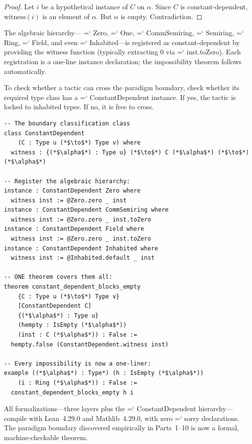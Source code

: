 \documentclass[11pt]{article}
\renewcommand{\texttt}[1]{%
  \begingroup\ttfamily\hyphenchar\font=`\-\relax
  \def\_{\textunderscore\discretionary{}{}{}}%
  #1\endgroup}
\theoremstyle{definition}
\theoremstyle{remark}
\begin{document}
\begin{proof}
Let $i$ be a hypothetical instance of $C$ on $\alpha$.
Since $C$ is constant-dependent, $\mathrm{witness}(i)$ is an
element of $\alpha$.  But $\alpha$ is empty.  Contradiction.
\end{proof}

\noindent The algebraic hierarchy---\texttt{Zero}, \texttt{One},
\texttt{CommSemiring}, \texttt{Semiring}, \texttt{Ring},
\texttt{Field}, and even \texttt{Inhabited}---is registered as
constant-dependent by providing the witness function (typically
extracting $0$ via \texttt{inst.toZero}).  Each registration is a
one-line instance declaration; the impossibility theorem follows
automatically.

To check whether a tactic can cross the paradigm boundary, check
whether its required type class has a \texttt{ConstantDependent}
instance.  If yes, the tactic is locked to inhabited types.  If
no, it is free to cross.

\begin{lstlisting}
-- The boundary classification class
class ConstantDependent
    (C : Type u (*$\to$*) Type v) where
  witness : {(*$\alpha$*) : Type u} (*$\to$*) C (*$\alpha$*) (*$\to$*) (*$\alpha$*)

-- Register the algebraic hierarchy:
instance : ConstantDependent Zero where
  witness inst := @Zero.zero _ inst
instance : ConstantDependent CommSemiring where
  witness inst := @Zero.zero _ inst.toZero
instance : ConstantDependent Field where
  witness inst := @Zero.zero _ inst.toZero
instance : ConstantDependent Inhabited where
  witness inst := @Inhabited.default _ inst

-- ONE theorem covers them all:
theorem constant_dependent_blocks_empty
    {C : Type u (*$\to$*) Type v}
    [ConstantDependent C]
    {(*$\alpha$*) : Type u}
    (hempty : IsEmpty (*$\alpha$*))
    (inst : C (*$\alpha$*)) : False :=
  hempty.false (ConstantDependent.witness inst)

-- Every impossibility is now a one-liner:
example ((*$\alpha$*) : Type*) (h : IsEmpty (*$\alpha$*))
    (i : Ring (*$\alpha$*)) : False :=
  constant_dependent_blocks_empty h i
\end{lstlisting}

\noindent All formalizations---three layers plus the
\texttt{ConstantDependent} hierarchy---compile with Lean~4.29.0
and Mathlib~4.29.0, with zero \texttt{sorry} declarations.
The paradigm boundary discovered empirically in Parts~1--10 is
now a formal, machine-checkable theorem.
\end{document}
